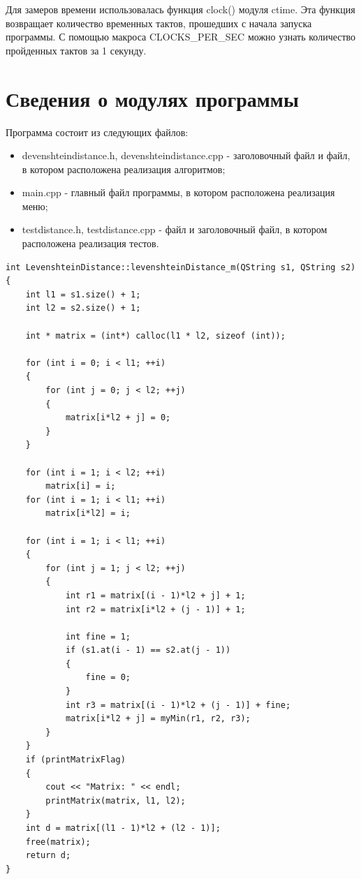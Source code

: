 \documentclass[14pt]{report}
\begin{document}
Для замеров времени использовалась функция clock() модуля ctime. Эта функция возвращает количество временных тактов, прошедших с начала запуска программы. С помощью макроса CLOCKS\_PER\_SEC можно узнать количество пройденных тактов за 1 секунду.

\section*{Сведения о модулях программы}

Программа состоит из следующих файлов:
\begin{itemize}
	\item devenshteindistance.h, devenshteindistance.cpp - заголовочный файл и файл, в котором расположена реализация алгоритмов;
	\item main.cpp - главный файл программы, в котором расположена реализация меню;
	\item testdistance.h, testdistance.cpp - файл и заголовочный файл, в котором расположена реализация тестов.
\end{itemize}


\begin{lstlisting}[label=some-code,caption=Функция для нахождения расстояния Левенштейна матрично]
int LevenshteinDistance::levenshteinDistance_m(QString s1, QString s2)
{
    int l1 = s1.size() + 1;
    int l2 = s2.size() + 1;

    int * matrix = (int*) calloc(l1 * l2, sizeof (int));

    for (int i = 0; i < l1; ++i)
    {
        for (int j = 0; j < l2; ++j)
        {
            matrix[i*l2 + j] = 0;
        }
    }

    for (int i = 1; i < l2; ++i)
        matrix[i] = i;
    for (int i = 1; i < l1; ++i)
        matrix[i*l2] = i;

    for (int i = 1; i < l1; ++i)
    {
        for (int j = 1; j < l2; ++j)
        {
            int r1 = matrix[(i - 1)*l2 + j] + 1;
            int r2 = matrix[i*l2 + (j - 1)] + 1;

            int fine = 1;
            if (s1.at(i - 1) == s2.at(j - 1))
            {
                fine = 0;
            }
            int r3 = matrix[(i - 1)*l2 + (j - 1)] + fine;
            matrix[i*l2 + j] = myMin(r1, r2, r3);
        }
    }
    if (printMatrixFlag)
    {
        cout << "Matrix: " << endl;
        printMatrix(matrix, l1, l2);
    }
    int d = matrix[(l1 - 1)*l2 + (l2 - 1)];
    free(matrix);
    return d;
}
\end{lstlisting}
\end{document}
